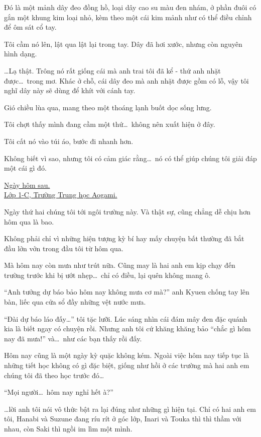 \documentclass[../main.tex]{subfiles}
\begin{document}
Đó là một mảnh dây đeo đồng hồ, loại dây cao su màu đen nhám, ở phần đuôi có gắn một khung kim loại nhỏ, kèm theo một cái kim mảnh như có thể điều chỉnh để ôm sát cổ tay.

Tôi cầm nó lên, lật qua lật lại trong tay. Dây đã hơi xước, nhưng còn nguyên hình dạng.

\dots Lạ thật. Trông nó rất giống cái mà anh trai tôi đã kể - thứ anh nhặt được\dots\ trong mơ. Khác ở chỗ, cái dây đeo mà anh nhặt được gồm có lỗ, vậy tôi nghĩ dây này sẽ dùng để khít với cánh tay.

Gió chiều lùa qua, mang theo một thoáng lạnh buốt dọc sống lưng.

Tôi chợt thấy mình đang cầm một thứ\dots\ không nên xuất hiện ở đây.

Tôi cất nó vào túi áo, bước đi nhanh hơn.

Không biết vì sao, nhưng tôi có cảm giác rằng\dots\ nó có thể giúp chúng tôi giải đáp một cái gì đó.

\begin{center}
  \uline{Ngày hôm sau.\\Lớp 1-C, Trường Trung học Aogami.}
\end{center}

Ngày thứ hai chúng tôi tới ngôi trường này. Và thật sự, cũng chẳng dễ chịu hơn hôm qua là bao.

Không phải chỉ vì những hiện tượng kỳ bí hay mấy chuyện bất thường đã bắt đầu lởn vởn trong đầu tôi từ hôm qua.

Mà hôm nay còn mưa như trút nữa. Cũng may là hai anh em kịp chạy đến trường trước khi bị ướt nhẹp\dots\ chỉ có điều, lại quên không mang ô.


``Anh tưởng dự báo bảo hôm nay không mưa cơ mà?'' anh Kyuen chống tay lên bàn, liếc qua cửa sổ đầy những vệt nước mưa.

``Đài dự báo láo đấy\dots'' tôi tặc lưỡi. Lúc sáng nhìn cái đám mây đen đặc quánh kia là biết ngay có chuyện rồi. Nhưng anh tôi cứ khăng khăng bảo ``chắc gì hôm nay đã mưa!'' và\dots\ như các bạn thấy rồi đấy.

Hôm nay cũng là một ngày kỳ quặc không kém. Ngoài việc hôm nay tiếp tục là những tiết học không có gì đặc biệt, giống như hồi ở các trường mà hai anh em chúng tôi đã theo học trước đó\dots

``Mọi người\dots\ hôm nay nghỉ hết à?''

\dots lời anh tôi nói vô thức bật ra lại đúng như những gì hiện tại. Chỉ có hai anh em tôi, Hanabi và Suzune đang ríu rít ở góc lớp, Inari và Touka thì thì thầm với nhau, còn Saki thì ngồi im lìm một mình.
\end{document}
